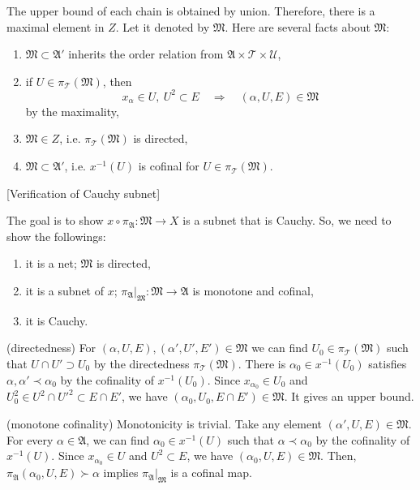 \documentclass[12pt]{article}
\begin{document}
\begin{pf}[1 of Theorem 1.1]
The upper bound of each chain is obtained by union.
Therefore, there is a maximal element in $Z$.
Let it denoted by $\mathfrak{M}$.
Here are several facts about $\mathfrak{M}$:
\begin{enumerate}
\item $\mathfrak{M}\subset\mathfrak{A}'$ inherits the order relation from $\mathfrak{A}\times\mathcal{T}\times\mathcal{U}$,
\item if $U\in\pi_\mathcal{T}(\mathfrak{M})$, then \[x_\alpha\in U,\ U^2\subset E\quad\Rightarrow\quad(\alpha,U,E)\in\mathfrak{M}\] by the maximality,
\item $\mathfrak{M}\in Z$, i.e. $\pi_\mathcal{T}(\mathfrak{M})$ is directed,
\item $\mathfrak{M}\subset\mathfrak{A}'$, i.e. $x^{-1}(U)$ is cofinal for $U\in\pi_\mathcal{T}(\mathfrak{M})$.
\end{enumerate}

[Verification of Cauchy subnet]

The goal is to show $x\circ\pi_\mathfrak{A}:\mathfrak{M}\to X$ is a subnet that is Cauchy.
So, we need to show the followings:
\begin{enumerate}
\item it is a net; $\mathfrak{M}$ is directed,
\item it is a subnet of $x$; $\pi_\mathfrak{A}|_\mathfrak{M}:\mathfrak{M}\to\mathfrak{A}$ is monotone and cofinal,
\item it is Cauchy.
\end{enumerate}

(directedness)
For $(\alpha,U,E),(\alpha',U',E')\in\mathfrak{M}$ we can find $U_0\in\pi_\mathcal{T}(\mathfrak{M})$ such that $U\cap U'\supset U_0$ by the directedness $\pi_\mathcal{T}(\mathfrak{M})$.
There is $\alpha_0\in x^{-1}(U_0)$ satisfies $\alpha,\alpha'\prec\alpha_0$ by the cofinality of $x^{-1}(U_0)$.
Since $x_{\alpha_0}\in U_0$ and $U_0^2\in U^2\cap U'^2\subset E\cap E'$, we have $(\alpha_0,U_0,E\cap E')\in\mathfrak{M}$.
It gives an upper bound.

(monotone cofinality)
Monotonicity is trivial.
Take any element $(\alpha',U,E)\in\mathfrak{M}$.
For every $\alpha\in\mathfrak{A}$, we can find $\alpha_0\in x^{-1}(U)$ such that $\alpha\prec\alpha_0$ by the cofinality of $x^{-1}(U)$.
Since $x_{\alpha_0}\in U$ and $U^2\subset E$, we have $(\alpha_0,U,E)\in\mathfrak{M}$.
Then, $\pi_\mathfrak{A}(\alpha_0,U,E)\succ\alpha$ implies $\pi_\mathfrak{A}|_\mathfrak{M}$ is a cofinal map.


\end{pf}
\end{document}
